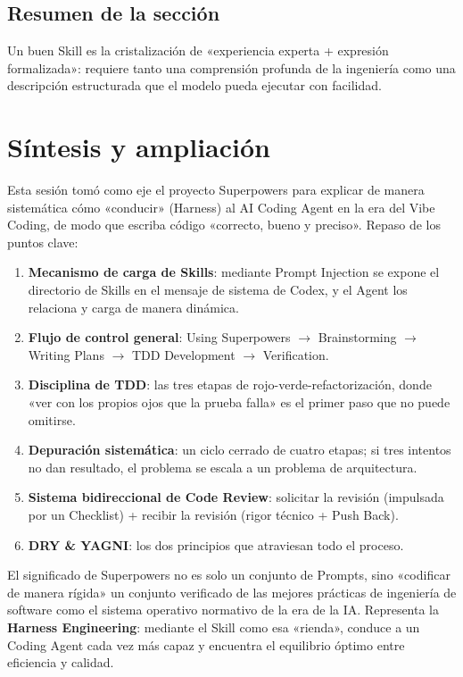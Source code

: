 \documentclass[a4paper]{article}
\begin{document}
\subsection{Resumen de la sección}

Un buen Skill es la cristalización de «experiencia experta + expresión formalizada»: requiere tanto una comprensión profunda de la ingeniería como una descripción estructurada que el modelo pueda ejecutar con facilidad.


\section{Síntesis y ampliación}

Esta sesión tomó como eje el proyecto Superpowers para explicar de manera sistemática cómo «conducir» (Harness) al AI Coding Agent en la era del Vibe Coding, de modo que escriba código «correcto, bueno y preciso». Repaso de los puntos clave:

\begin{enumerate}
    \item \textbf{Mecanismo de carga de Skills}: mediante Prompt Injection se expone el directorio de Skills en el mensaje de sistema de Codex, y el Agent los relaciona y carga de manera dinámica.
    \item \textbf{Flujo de control general}: Using Superpowers $\rightarrow$ Brainstorming $\rightarrow$ Writing Plans $\rightarrow$ TDD Development $\rightarrow$ Verification.
    \item \textbf{Disciplina de TDD}: las tres etapas de rojo-verde-refactorización, donde «ver con los propios ojos que la prueba falla» es el primer paso que no puede omitirse.
    \item \textbf{Depuración sistemática}: un ciclo cerrado de cuatro etapas; si tres intentos no dan resultado, el problema se escala a un problema de arquitectura.
    \item \textbf{Sistema bidireccional de Code Review}: solicitar la revisión (impulsada por un Checklist) + recibir la revisión (rigor técnico + Push Back).
    \item \textbf{DRY \& YAGNI}: los dos principios que atraviesan todo el proceso.
\end{enumerate}

El significado de Superpowers no es solo un conjunto de Prompts, sino «codificar de manera rígida» un conjunto verificado de las mejores prácticas de ingeniería de software como el sistema operativo normativo de la era de la IA. Representa la \textbf{Harness Engineering}: mediante el Skill como esa «rienda», conduce a un Coding Agent cada vez más capaz y encuentra el equilibrio óptimo entre eficiencia y calidad.
\end{document}
